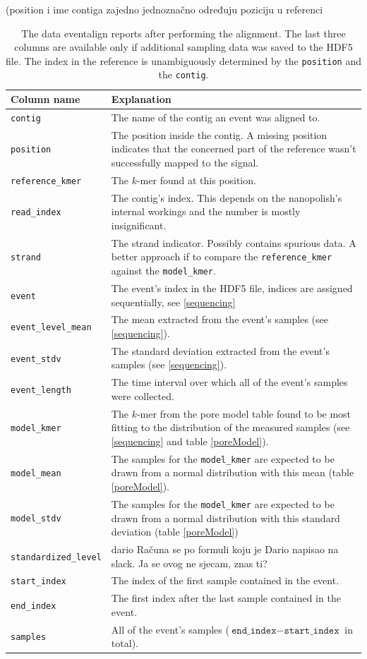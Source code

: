\documentclass[times, utf, seminar]{fer}
\begin{document}
(position i ime contiga zajedno jednoznačno određuju poziciju u referenci

\begin{table}
	\centering
	\begin{tabular}{l|p{10cm}}
		Column name & Explanation\\
		\hline
	\texttt{contig} & The name of the contig an event was aligned to. \\
	\texttt{position} & The position inside the contig. A missing position indicates that the concerned part of the reference wasn't successfully mapped to the signal. \\
	\texttt{reference\_kmer} & The $k$-mer found at this position. \\       
	\texttt{read\_index} & The contig's index. This depends on the nanopolish's internal workings and the number is mostly insignificant. \\
	\texttt{strand}  & The strand indicator. Possibly contains spurious data. A better approach if to compare the \texttt{reference\_kmer} against the \texttt{model\_kmer}. \\
	\texttt{event} &  The event's index in the HDF5 file, indices are assigned sequentially, see \ref{sequencing}\\
	\texttt{event\_level\_mean} & The mean extracted from the event's samples (see \ref{sequencing}). \\
	\texttt{event\_stdv} & The standard deviation extracted from the event's samples (see \ref{sequencing}). \\
	\texttt{event\_length} & The time interval over which all of the event's samples were collected. \\
	\texttt{model\_kmer} & The $k$-mer from the pore model table found to be most fitting to the distribution of the measured samples (see \ref{sequencing} and table \ref{poreModel}). \\
	\texttt{model\_mean} & The samples for the \texttt{model\_kmer} are expected to be drawn from a normal distribution with this mean (table \ref{poreModel}). \\
	\texttt{model\_stdv} & The samples for the \texttt{model\_kmer} are expected to be drawn from a normal distribution with this standard deviation (table \ref{poreModel}) \\
	\texttt{standardized\_level} & dario Računa se po formuli koju je Dario napisao na slack. Ja se ovog ne sjecam, znas ti? \\
	\texttt{start\_index} & The index of the first sample contained in the event. \\               
	\texttt{end\_index} & The first index after the last sample contained in the event. \\
	\texttt{samples} & All of the event's samples ($\texttt{end\_index} - \texttt{start\_index}$ in total).     
	\end{tabular}
	\caption{The data eventalign reports after performing the alignment. The last three columns are available only if additional sampling data was saved to the HDF5 file. The index in the reference is unambiguously determined by the \texttt{position} and the \texttt{contig}.}
	\label{nanopolishOutput}
\end{table}
\end{document}

